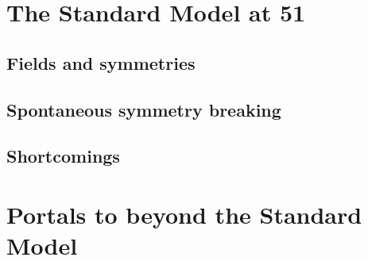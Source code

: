 \section{The Standard Model at 51}

\subsection{Fields and symmetries}

\subsection{Spontaneous symmetry breaking}

\subsection{Shortcomings}

\section{Portals to beyond the Standard Model}


